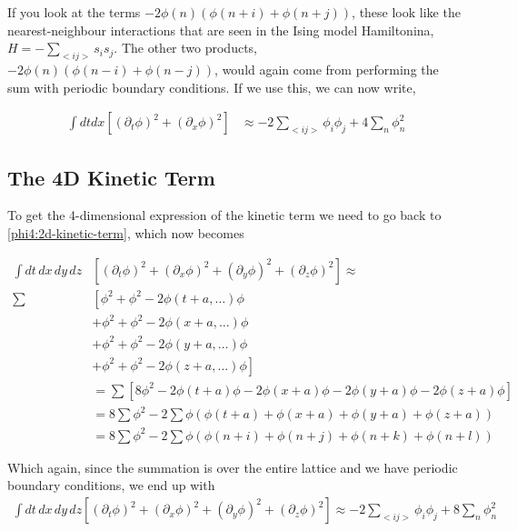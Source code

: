 If you look at the terms $- 2\phi(n) \left( \phi(n+i) + \phi(n+j) \right)$, these look like the nearest-neighbour
interactions that are seen in the Ising model Hamiltonina, $H = -\sum_{<ij>}s_i s_j$.
The other two products, $- 2\phi(n) \left( \phi(n-i) + \phi(n-j) \right)$, would again come from performing the sum with
periodic boundary conditions.
If we use this, we can now write,

\begin{align}
\int dt dx \left[ \left( \partial_t \phi \right)^2 + \left( \partial_x \phi \right)^2 \right] &\approx
- 2 \sum_{<ij>} \phi_i \phi_j + 4 \sum_n \phi^{2}_{n} \label{phi4:2d-kinetic-term-lattice}
\end{align}


\subsection{The 4D Kinetic Term}

To get the 4-dimensional expression of the kinetic term we need to go back to \ref{phi4:2d-kinetic-term}, which now becomes

\begin{align*}
\int dt \, dx \, dy \, dz & \left[ 
    \left( \partial_t \phi \right)^2 + \left( \partial_x \phi \right)^2 +  \left( \partial_y \phi \right)^2 + \left( \partial_z \phi \right)^2
\right] \approx \\
\sum & \left[ \phi^2 + \phi^2 - 2\phi(t+a, \ldots) \phi \right. \\
    & + \phi^2 + \phi^2 - 2\phi(x+a, \ldots) \phi \\
    & + \phi^2 + \phi^2 - 2\phi(y+a, \ldots) \phi \\
    & \left. + \phi^2 + \phi^2 - 2\phi(z+a, \ldots) \phi \right] \\
&= \sum \left[ 8\phi^2 - 2\phi(t+a)\phi - 2\phi(x+a)\phi - 2\phi(y+a)\phi - 2\phi(z+a)\phi \right] \\
&= 8 \sum \phi^2 - 2 \sum \phi \left( \phi(t+a) + \phi(x+a) + \phi(y+a) + \phi(z+a) \right) \\
&= 8 \sum \phi^{2} - 2 \sum \phi \left( \phi(n+i) + \phi(n+j) + \phi(n+k) + \phi(n+l) \right)
\end{align*}

Which again, since the summation is over the entire lattice and we have periodic boundary conditions,
we end up with
\begin{align*}
\int dt \, dx \, dy \, dz \left[ 
    \left( \partial_t \phi \right)^2 + \left( \partial_x \phi \right)^2 +  \left( \partial_y \phi \right)^2 + \left( \partial_z \phi \right)^2
\right] \approx 
- 2 \sum_{<ij>} \phi_i \phi_j + 8 \sum_n \phi^{2}_{n}
\end{align*}

